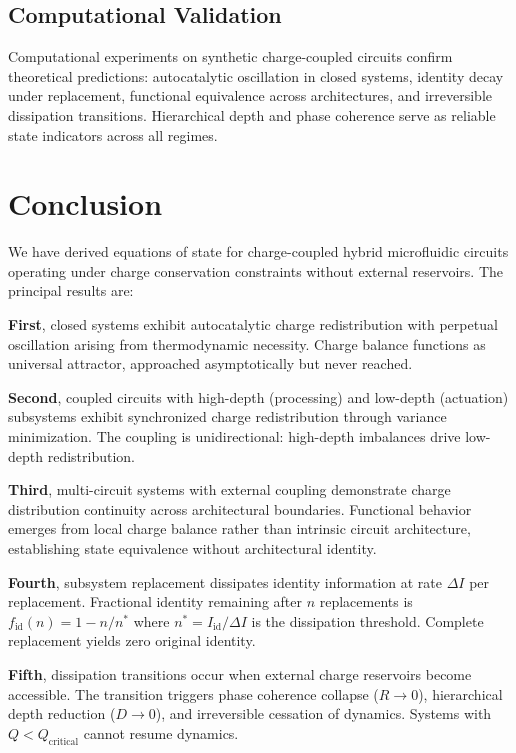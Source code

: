 \documentclass[12pt,a4paper]{article}
\theoremstyle{plain}
\theoremstyle{definition}
\theoremstyle{remark}
\begin{document}
\subsection{Computational Validation}

Computational experiments on synthetic charge-coupled circuits confirm theoretical predictions: autocatalytic oscillation in closed systems, identity decay under replacement, functional equivalence across architectures, and irreversible dissipation transitions. Hierarchical depth and phase coherence serve as reliable state indicators across all regimes.

\section{Conclusion}
\label{sec:conclusion}

We have derived equations of state for charge-coupled hybrid microfluidic circuits operating under charge conservation constraints without external reservoirs. The principal results are:

\textbf{First}, closed systems exhibit autocatalytic charge redistribution with perpetual oscillation arising from thermodynamic necessity. Charge balance functions as universal attractor, approached asymptotically but never reached.

\textbf{Second}, coupled circuits with high-depth (processing) and low-depth (actuation) subsystems exhibit synchronized charge redistribution through variance minimization. The coupling is unidirectional: high-depth imbalances drive low-depth redistribution.

\textbf{Third}, multi-circuit systems with external coupling demonstrate charge distribution continuity across architectural boundaries. Functional behavior emerges from local charge balance rather than intrinsic circuit architecture, establishing state equivalence without architectural identity.

\textbf{Fourth}, subsystem replacement dissipates identity information at rate $\Delta I$ per replacement. Fractional identity remaining after $n$ replacements is $f_{\text{id}}(n) = 1 - n/n^*$ where $n^* = I_{\text{id}} / \Delta I$ is the dissipation threshold. Complete replacement yields zero original identity.

\textbf{Fifth}, dissipation transitions occur when external charge reservoirs become accessible. The transition triggers phase coherence collapse ($R \to 0$), hierarchical depth reduction ($D \to 0$), and irreversible cessation of dynamics. Systems with $Q < Q_{\text{critical}}$ cannot resume dynamics.
\end{document}
